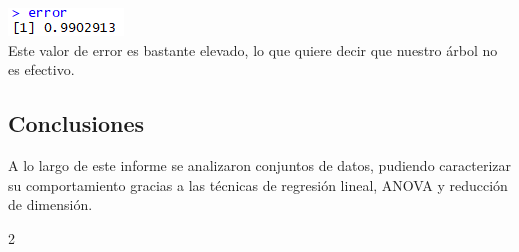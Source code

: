 \documentclass[twoside]{article}
\begin{document}
\begin{multicols}{2}
\includegraphics[scale=0.7]{images/pic_40.png}\\

Este valor de error es bastante elevado, lo que quiere decir que nuestro \'arbol no es efectivo.

\subsection{Conclusiones}
A lo largo de este informe se analizaron conjuntos de datos, pudiendo caracterizar su comportamiento gracias a las t\'ecnicas de regresi\'on lineal, ANOVA y reducci\'on de dimensi\'on.

\end{multicols}{2}
\end{document}
